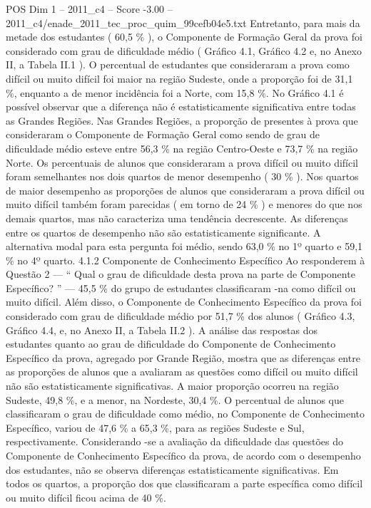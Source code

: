 \begin{textsample}{POS Dim 1 – 2011\_c4 – Score -3.00 – 2011\_c4/enade\_2011\_tec\_proc\_quim\_99cefb04e5.txt}
Entretanto, para mais da metade dos estudantes ( 60,5 \% ), o Componente de Formação Geral da prova foi considerado com grau de dificuldade médio ( Gráfico 4.1, Gráfico 4.2 e, no Anexo II, a Tabela II.1 ).
O percentual de estudantes que consideraram a prova como difícil ou muito difícil foi maior na região Sudeste, onde a proporção foi de 31,1 \%, enquanto a de menor incidência foi a Norte, com 15,8 \%.
No Gráfico 4.1 é possível observar que a diferença não é estatisticamente significativa entre todas as Grandes Regiões.
Nas Grandes Regiões, a proporção de presentes à prova que consideraram o Componente de Formação Geral como sendo de grau de dificuldade médio esteve entre 56,3 \% na região Centro-Oeste e 73,7 \% na região Norte.
Os percentuais de alunos que consideraram a prova difícil ou muito difícil foram semelhantes nos dois quartos de menor desempenho ( 30 \% ).
Nos quartos de maior desempenho as proporções de alunos que consideraram a prova difícil ou muito difícil também foram parecidas ( em torno de 24 \% ) e menores do que nos demais quartos, mas não caracteriza uma tendência decrescente.
As diferenças entre os quartos de desempenho não são estatisticamente significante.
A alternativa modal para esta pergunta foi médio, sendo 63,0 \% no 1º quarto e 59,1 \% no 4º quarto. 4.1.2 Componente de Conhecimento Específico Ao responderem à Questão 2 — “ Qual o grau de dificuldade desta prova na parte de Componente Específico? ” — 45,5 \% do grupo de estudantes classificaram -na como difícil ou muito difícil.
Além disso, o Componente de Conhecimento Específico da prova foi considerado com grau de dificuldade médio por 51,7 \% dos alunos ( Gráfico 4.3, Gráfico 4.4, e, no Anexo II, a Tabela II.2 ).
A análise das respostas dos estudantes quanto ao grau de dificuldade do Componente de Conhecimento Específico da prova, agregado por Grande Região, mostra que as diferenças entre as proporções de alunos que a avaliaram as questões como difícil ou muito difícil não são estatisticamente significativas.
A maior proporção ocorreu na região Sudeste, 49,8 \%, e a menor, na Nordeste, 30,4 \%.
O percentual de alunos que classificaram o grau de dificuldade como médio, no Componente de Conhecimento Específico, variou de 47,6 \% a 65,3 \%, para as regiões Sudeste e Sul, respectivamente.
Considerando -se a avaliação da dificuldade das questões do Componente de Conhecimento Específico da prova, de acordo com o desempenho dos estudantes, não se observa diferenças estatisticamente significativas.
Em todos os quartos, a proporção dos que classificaram a parte específica como difícil ou muito difícil ficou acima de 40 \%.

\end{textsample}
